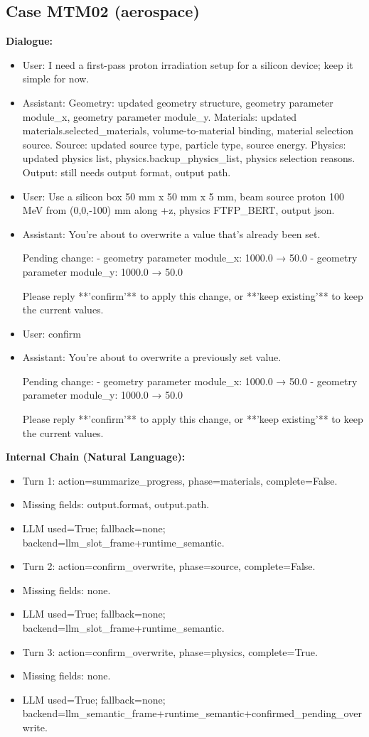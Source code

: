 \documentclass[11pt]{ctexart}
\begin{document}
\subsection{Case MTM02 (aerospace)}
\textbf{Dialogue:}
\begin{itemize}
\item User: I need a first-pass proton irradiation setup for a silicon device; keep it simple for now.
\item Assistant: Geometry: updated geometry structure, geometry parameter module\_x, geometry parameter module\_y. Materials: updated materials.selected\_materials, volume-to-material binding, material selection source. Source: updated source type, particle type, source energy. Physics: updated physics list, physics.backup\_physics\_list, physics selection reasons. Output: still needs output format, output path.
\item User: Use a silicon box 50 mm x 50 mm x 5 mm, beam source proton 100 MeV from (0,0,-100) mm along +z, physics FTFP\_BERT, output json.
\item Assistant: You're about to overwrite a value that's already been set.

Pending change:
- geometry parameter module\_x: 1000.0 → 50.0
- geometry parameter module\_y: 1000.0 → 50.0

Please reply **'confirm'** to apply this change, or **'keep existing'** to keep the current values.
\item User: confirm
\item Assistant: You're about to overwrite a previously set value.

Pending change:
- geometry parameter module\_x: 1000.0 → 50.0
- geometry parameter module\_y: 1000.0 → 50.0

Please reply **'confirm'** to apply this change, or **'keep existing'** to keep the current values.
\end{itemize}
\textbf{Internal Chain (Natural Language):}
\begin{itemize}
\item Turn 1: action=summarize\_progress, phase=materials, complete=False.
\item Missing fields: output.format, output.path.
\item LLM used=True; fallback=none; backend=llm\_slot\_frame+runtime\_semantic.
\item Turn 2: action=confirm\_overwrite, phase=source, complete=False.
\item Missing fields: none.
\item LLM used=True; fallback=none; backend=llm\_slot\_frame+runtime\_semantic.
\item Turn 3: action=confirm\_overwrite, phase=physics, complete=True.
\item Missing fields: none.
\item LLM used=True; fallback=none; backend=llm\_semantic\_frame+runtime\_semantic+confirmed\_pending\_overwrite.
\end{itemize}
\end{document}
